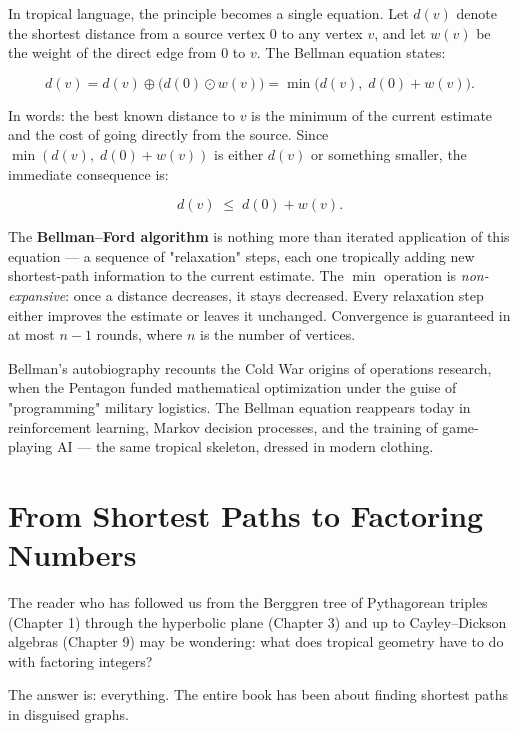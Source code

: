 \documentclass[11pt,twoside,openright]{book}
\theoremstyle{definition}
\theoremstyle{remark}
\begin{document}
In tropical language, the principle becomes a single equation. Let $d(v)$ denote the shortest distance from a source vertex $0$ to any vertex $v$, and let $w(v)$ be the weight of the direct edge from $0$ to $v$. The Bellman equation states:

\[d(v) = d(v) \oplus \big(d(0) \odot w(v)\big) = \min\!\big(d(v),\; d(0) + w(v)\big).\]

In words: the best known distance to $v$ is the minimum of the current estimate and the cost of going directly from the source. Since $\min(d(v),\; d(0) + w(v))$ is either $d(v)$ or something smaller, the immediate consequence is:

\[d(v) \;\le\; d(0) + w(v).\]


The \textbf{Bellman--Ford algorithm} is nothing more than iterated application of this equation --- a sequence of "relaxation" steps, each one tropically adding new shortest-path information to the current estimate. The $\min$ operation is \textit{non-expansive}: once a distance decreases, it stays decreased. Every relaxation step either improves the estimate or leaves it unchanged. Convergence is guaranteed in at most $n - 1$ rounds, where $n$ is the number of vertices.

Bellman's autobiography recounts the Cold War origins of operations research, when the Pentagon funded mathematical optimization under the guise of "programming" military logistics. The Bellman equation reappears today in reinforcement learning, Markov decision processes, and the training of game-playing AI --- the same tropical skeleton, dressed in modern clothing.


\section{From Shortest Paths to Factoring Numbers}

The reader who has followed us from the Berggren tree of Pythagorean triples (Chapter 1) through the hyperbolic plane (Chapter 3) and up to Cayley--Dickson algebras (Chapter 9) may be wondering: what does tropical geometry have to do with factoring integers?

The answer is: everything. The entire book has been about finding shortest paths in disguised graphs.
\end{document}

